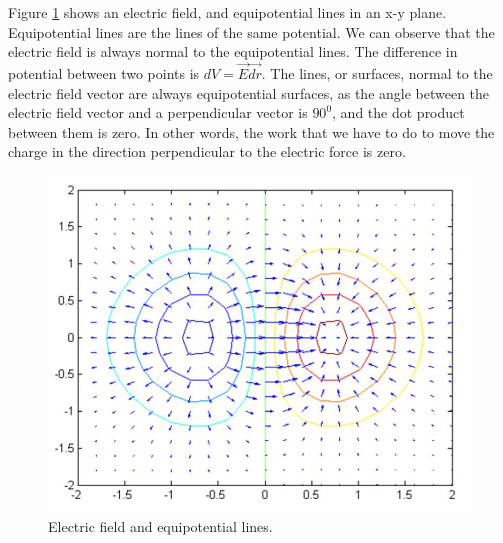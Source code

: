 \documentclass{ximera}
\begin{document}
\begin{example}
Figure \ref{fig:gradient} shows an electric field, and equipotential lines in an x-y plane. Equipotential lines are the lines of the same potential. We can observe that the electric field is always normal to the equipotential lines. The difference in potential between two points is $dV=\vec{E} \vec{dr}$. The lines, or surfaces, normal to the electric field vector are always equipotential surfaces, as the angle between the electric field vector and a perpendicular vector is $90^0$, and the dot product between them is zero. In other words, the work that we have to do to move the charge in the direction perpendicular to the electric force is zero.

\begin{figure}[htbp]
\begin{center}
\includegraphics[scale=0.4]{../jpg/gradient.jpg}
\end{center} 
\caption{Electric field and equipotential lines.}\label{fig:gradient}
\end{figure}

\end{example}
\end{document}
